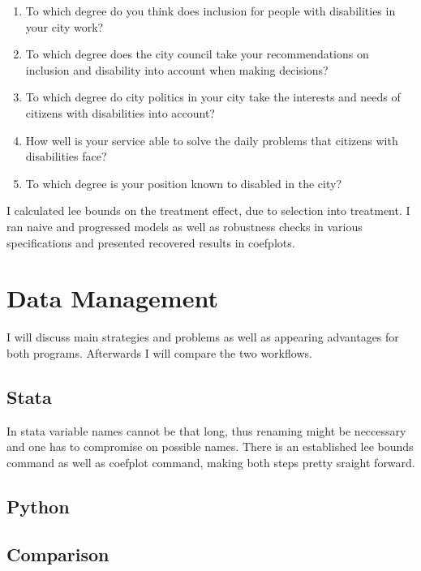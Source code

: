 \documentclass[10pt]{article}
\begin{document}
\begin{enumerate}

\item To which degree do you think does inclusion for people with disabilities in your city work? 

\item To which degree does the city council take your recommendations on inclusion and disability into account when making decisions?

\item To which degree do city politics in your city take the interests and needs of citizens with disabilities into account?

\item How well is your service able to solve the daily problems that citizens with disabilities face?

\item To which degree is your position known to disabled in the city?

\end{enumerate}

I calculated lee bounds on the treatment effect, due to selection into treatment. I ran naive and progressed
models as well as robustness checks in various specifications and presented recovered results in coefplots.

\section{Data Management}
I will discuss main strategies and problems as well as appearing advantages for both programs. Afterwards I 
will compare the two workflows.
\subsection{Stata}
In stata variable names cannot be that long, thus renaming might be neccessary and one has to compromise on possible names.
There is an established lee bounds command as well as coefplot command, making both steps pretty sraight forward. 


\subsection{Python}


\subsection{Comparison}
\end{document}
